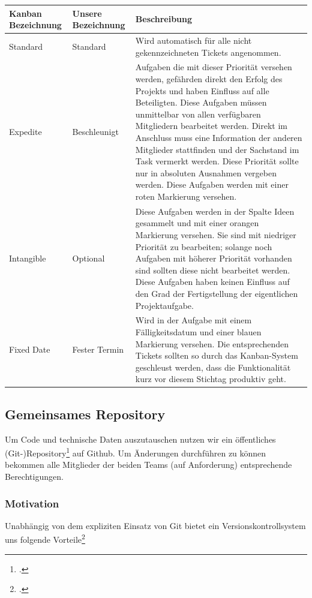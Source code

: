 \begin{minipage}{\textwidth}
\begin{center}
\begin{tabular}{p{2.2cm}p{2.4cm}p{10.8cm}}
\toprule
Kanban \newline Bezeichnung & Unsere \newline Bezeichnung & Beschreibung \\
\midrule
Standard & Standard & Wird automatisch für alle nicht gekennzeichneten Tickets angenommen. \\
Expedite & Beschleunigt & Aufgaben die mit dieser Priorität versehen werden, gefährden direkt den Erfolg des Projekts und haben Einfluss auf alle Beteiligten. Diese Aufgaben müssen unmittelbar von allen verfügbaren Mitgliedern bearbeitet werden. Direkt im Anschluss muss eine Information der anderen Mitglieder stattfinden und der Sachstand im Task vermerkt werden. Diese Priorität sollte nur in absoluten Ausnahmen vergeben werden. Diese Aufgaben werden mit einer roten Markierung versehen. \\
Intangible & Optional & Diese Aufgaben werden in der Spalte Ideen gesammelt und mit einer orangen Markierung versehen. Sie sind mit niedriger Priorität zu bearbeiten; solange noch Aufgaben mit höherer Priorität vorhanden sind sollten diese nicht bearbeitet werden. Diese Aufgaben haben keinen Einfluss auf den Grad der Fertigstellung der eigentlichen Projektaufgabe.\\
Fixed Date & Fester \newline Termin & Wird in der Aufgabe mit einem Fälligkeitsdatum und einer blauen Markierung versehen. Die entsprechenden Tickets sollten so durch das Kanban-System geschleust werden, dass die Funktionalität kurz vor diesem Stichtag produktiv geht. \\
\bottomrule
\end{tabular}
\end{center}
\end{minipage}

\subsection{Gemeinsames Repository}
Um Code und technische Daten auszutauschen nutzen wir ein öffentliches (Git-)Repository\footcite{githubRepo} auf Github. Um Änderungen durchführen zu können bekommen alle Mitglieder der beiden Teams (auf Anforderung) entsprechende Berechtigungen.

\subsubsection{Motivation}
Unabhängig von dem expliziten Einsatz von Git bietet ein Versionskontrollsystem uns folgende Vorteile\footcite{stackoverflowVersionControl}

